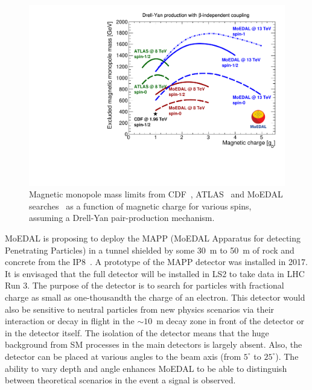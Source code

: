 \begin{figure}[ht]
   \centering
   \includegraphics[width=0.9\linewidth]{plots/atlas-moedal-cdf.pdf}
   \caption{Magnetic monopole mass limits from CDF~\cite{Abulencia:2005hb}, ATLAS~\cite{Aad:2015kta} and MoEDAL searches~\cite{MoEDAL:2016jlb,Acharya:2017cio} as a function of magnetic charge for various spins, assuming a Drell-Yan pair-production mechanism. }
   \label{fg:limits}
\end{figure}


MoEDAL is proposing to deploy the MAPP (MoEDAL Apparatus for detecting Penetrating Particles) in a tunnel shielded by some 30~m to 50~m of rock and concrete from the IP8~\cite{Pinfold:2017dot,mapp-mall-pinfold}. A prototype of the MAPP detector was installed in 2017. It is envisaged that the full detector will be installed in LS2 to take data in LHC Run 3. The purpose of the detector is to search for particles with fractional charge as small as one-thousandth the charge of an electron. This detector would also be sensitive to neutral particles from new physics scenarios via their interaction or decay in flight in the $\sim10$~m decay zone in front of the detector or in the detector itself. The isolation of the detector means that the huge background from SM processes in the main detectors is largely absent. Also, the detector can be placed at various angles to the beam axis (from $5^\circ$ to $25^\circ$). The ability to vary depth and angle enhances  MoEDAL to be able to distinguish between theoretical scenarios in the event a signal is observed.

